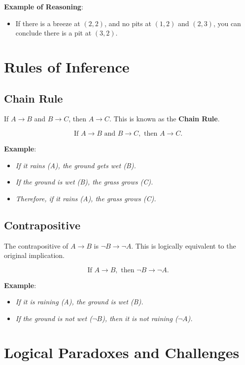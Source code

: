 \documentclass{article}
\begin{document}
\textbf{Example of Reasoning}:
\begin{itemize}
    \item If there is a breeze at $(2, 2)$, and no pits at $(1, 2)$ and $(2, 3)$, you can conclude there is a pit at $(3, 2)$.
\end{itemize}

\section{Rules of Inference}

\subsection{Chain Rule}

If $A \rightarrow B$ and $B \rightarrow C$, then $A \rightarrow C$. This is known as the \textbf{Chain Rule}.

\[
\text{If } A \rightarrow B \text{ and } B \rightarrow C, \text{ then } A \rightarrow C.
\]

\textbf{Example}:
\begin{itemize}
    \item \textit{If it rains (A), the ground gets wet (B).}
    \item \textit{If the ground is wet (B), the grass grows (C).}
    \item \textit{Therefore, if it rains (A), the grass grows (C).}
\end{itemize}

\subsection{Contrapositive}

The contrapositive of $A \rightarrow B$ is $\neg B \rightarrow \neg A$. This is logically equivalent to the original implication.

\[
\text{If } A \rightarrow B, \text{ then } \neg B \rightarrow \neg A.
\]

\textbf{Example}:
\begin{itemize}
    \item \textit{If it is raining (A), the ground is wet (B).}
    \item \textit{If the ground is not wet ($\neg B$), then it is not raining ($\neg A$).}
\end{itemize}

\section{Logical Paradoxes and Challenges}
\end{document}
